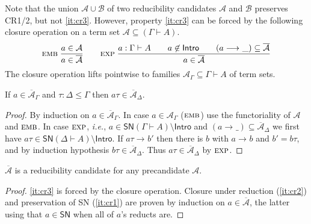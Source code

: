 \documentclass[a4paper,USenglish,cleveref, autoref, thm-restate]{lipics-v2021}
\newcommand{\ie}{\emph{i.e.}\xspace}
\newcommand{\nru}[3]{#1\;\dfrac{#2}{#3}}
\newcommand{\rulename}[1]{\ensuremath{\mbox{\textsc{#1}}}\xspace}
\newcommand{\remb}{\rulename{emb}}
\newcommand{\rexp}{\rulename{exp}}
\newcommand{\red}[1][]{\longrightarrow_{#1}}
\newcommand{\cl}[1]{\overline{#1}}
\newcommand{\A}{\mathcal{A}}
\newcommand{\B}{\mathcal{B}}
\newcommand{\SN}{\mathsf{SN}}
\newcommand{\Intro}{\mathsf{Intro}}
\begin{document}
Note that the union $\A \cup \B$ of two reducibility candidates $\A$
and $\B$ preserves CR1/2, but not \ref{it:cr3}.
However,
property \ref{it:cr3} can be forced by the following closure operation \fbox{$\cl\A$}
on a term set $\A \subseteq (\Gamma \vdash A)$.
\begin{gather*}
  \nru{\remb
    }{a \in \A
    }{a \in \cl\A
    }
\qquad
  \nru{\rexp
     }{a : \Gamma \vdash A \qquad
       a \not\in \Intro \qquad
       (a \red \_) \subseteq \cl\A
     }{a \in \cl\A}
\end{gather*}
The closure operation lifts pointwise to families
$\A_\Gamma \subseteq \Gamma \vdash A$ of term sets.
\begin{lemma}
  If $a \in \cl\A_\Gamma$ and $\tau : \Delta \leq \Gamma$ then
  $a \tau \in \cl\A_\Delta$.
\end{lemma}
\begin{proof}
  By induction on $a \in \cl\A_\Gamma$.  In case $a \in \A_\Gamma$
  (\remb) use the functoriality of $\A$ and \remb.
  In case \rexp, \ie, $a \in \SN(\Gamma \vdash A)
  \setminus \Intro$ and $(a \red\_) \subseteq \cl\A_\Delta$ we first
  have $a \tau \in \SN(\Delta \vdash A) \setminus \Intro$.  If $a\tau
  \red b'$ then there is $b$ with $a \red b$ and $b' = b\tau$, and by
  induction hypothesis $b\tau \in \cl\A_\Delta$.  Thus $a\tau \in
  \cl\A_\Delta$ by \rexp.
\end{proof}

\begin{lemma}[Saturation]
  $\cl\A$ is a reducibility candidate for any precandidate $\A$.
\end{lemma}
\begin{proof}
  \ref{it:cr3} is forced by the closure operation.
  Closure under reduction (\ref{it:cr2}) and preservation of SN
  (\ref{it:cr1}) are proven by induction on $a \in \cl\A$,
  the latter using that $a \in \SN$ when all of $a$'s reducts are.
\end{proof}

\end{document}
